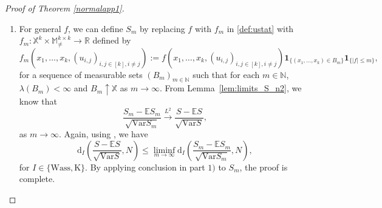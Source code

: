 \documentclass{article}
\theoremstyle{definition}
\numberwithin{equation}{section}
\theoremstyle{remark}
\newcommand{\E}{\mathbb{E}}
\newcommand{\Var}{\mathrm{Var}}
\begin{document}
\begin{proof}[Proof of Theorem \ref{normalapp1}]
\begin{enumerate}
\item[2)] For general $f$, we can define $S_m$ by replacing $f$ with $f_m$ in \eqref{def:ustat} with $f_m:\mathbb{X}^k\times \mathbb{M}^{k\times k}_{\neq}\to\mathbb{R}$ defined by 
\begin{equation*}
f_m(x_1,\ldots,x_k, (u_{i,j})_{i,j\in[k], i\neq j}):=f(x_1,\ldots,x_k, (u_{i,j})_{i,j\in[k], i\neq j})\mathbf{1}_{\{(x_1,\ldots,x_k)\in B_m\}}\mathbf{1}_{\{|f|\le m\}},
\end{equation*}
for a sequence of measurable sets $(B_m)_{m\in\mathbb{N}}$ such that for each $m\in\mathbb{N}$, $\lambda(B_m)<\infty$ and $ B_m\uparrow\mathbb{X}$ as $m\to\infty$. 
From Lemma~\ref{lem:limits_S_n2}, we know that
\begin{equation}
\frac{S_m-\E S_m}{\sqrt{\Var S_m}}\overset{L^2}{\longrightarrow}\frac{S-\E S}{\sqrt{\Var S}},
\end{equation}
as $m\to\infty$. Again, using \cite[Lemma~6.2]{Last_Nestmann_Schulte}, we have
\begin{equation}
	\mathrm{d}_I\left(\frac{S-\E S}{\sqrt{\Var S}},N\right)\le\liminf_{m\to\infty}\mathrm{d}_I\left(\frac{S_m-\E S_m}{\sqrt{\Var S_m}},N\right),
\end{equation}
for $I\in\{\mathrm{Wass, K}\}$. By applying conclusion in part $1)$ to $S_m$, the proof is complete.
\end{enumerate}








\end{proof}
\end{document}
